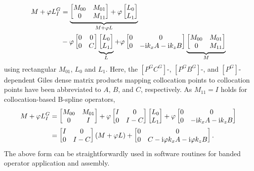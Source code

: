 \begin{align}
    \label{eq:dimeulertransformevolve_linearpartition}
    M + \varphi{}L_I^G
&=
    \underbrace{%
    \begin{bmatrix} M_{00} & M_{01} \\ 0 & M_{11} \end{bmatrix}
    +
    \varphi
    \begin{bmatrix} L_{0} \\ L_{1} \end{bmatrix}
    }_{M + \varphi{}L}
\notag\\
&-
    \varphi
    \begin{bmatrix} 0 & 0 \\ 0 & C \end{bmatrix}
    \underbrace{%
    \begin{bmatrix} L_{0} \\ L_{1} \end{bmatrix}
    }_L
    +
    \varphi
    \begin{bmatrix} 0 & 0 \\ 0 & - \ii k_x A - \ii k_z B \end{bmatrix}
    \underbrace{%
    \begin{bmatrix} M_{00} & M_{01} \\ 0 & M_{11} \end{bmatrix}
    }_M
\end{align}
using rectangular $M_{01}$, $L_0$ and $L_1$.  Here, the $\left[P^G
C^G\right]$-, $\left[P^G B^G\right]$-, and $\left[P^G\right]$-dependent Giles
dense matrix products mapping collocation points to collocation points have been
abbreviated to $A$, $B$, and $C$, respectively. As $M_{11} = I$ holds for
collocation-based B-spline operators,
\begin{align}
    M + \varphi{}L_I^G
&=
    \begin{bmatrix} M_{00} & M_{01} \\ 0 & I \end{bmatrix}
    +
    \varphi
    \begin{bmatrix} I & 0 \\ 0 & I - C \end{bmatrix}
    \begin{bmatrix} L_{0} \\ L_{1} \end{bmatrix}
    +
    \varphi
    \begin{bmatrix} 0 & 0 \\ 0 & - \mathrm{i} k_x A - \mathrm{i} k_z B \end{bmatrix}
\notag\\
&=
    \label{eq:dimeulertransformevolve_linearfact}
    \begin{bmatrix} I & 0 \\ 0 & I - C \end{bmatrix}
    \left(M + \varphi{}L\right)
    +
    \begin{bmatrix}
        0 & 0 \\
        0 & C - \mathrm{i} \varphi{} k_x A - \mathrm{i} \varphi{} k_z B
    \end{bmatrix}.
\end{align}
The above form can be straightforwardly used in software routines for banded
operator application and assembly.

